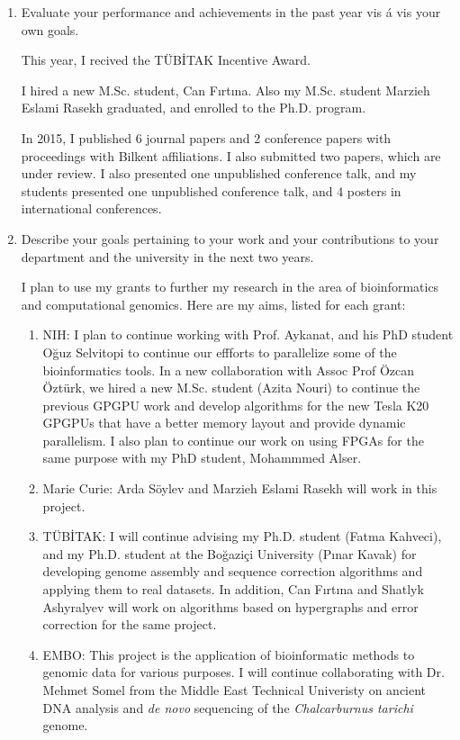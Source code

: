 \begin{enumerate}

\item Evaluate your performance and achievements in the past year vis á vis your own goals. 

This year, I recived the TÜBİTAK Incentive Award.

I hired a new M.Sc. student, Can Fırtına. Also my M.Sc. student Marzieh Eslami Rasekh graduated, and enrolled to the Ph.D. program.

In 2015, I published 6 journal papers and 2 conference papers with proceedings with Bilkent affiliations. I also submitted two papers, which are under review.
I also presented one unpublished conference talk, and my students presented one unpublished conference talk, and 4 posters in international conferences.


\item Describe your goals pertaining to your work and your contributions to your department and the university in the next two years. 

I plan to use my grants to further my research in the area of bioinformatics and computational genomics. Here are my aims, listed for each grant:

\begin{enumerate}

\item NIH: I plan to continue working with Prof. Aykanat, and his PhD student Oğuz Selvitopi to continue our effforts to parallelize some of the bioinformatics tools. In a new collaboration with Assoc Prof Özcan Öztürk, we hired a new M.Sc. student (Azita Nouri) to continue the previous GPGPU work and develop algorithms for the new Tesla K20 GPGPUs that have a better memory layout and provide dynamic parallelism.
I also plan to continue our work on using FPGAs for the same purpose with my PhD student, Mohammmed Alser.
\item Marie Curie: Arda Söylev and Marzieh Eslami Rasekh will work in this project.
\item TÜBİTAK: I will continue advising my Ph.D. student (Fatma Kahveci), and my Ph.D. student at the Boğaziçi University (Pınar Kavak) for developing genome assembly and sequence correction algorithms and applying them to real datasets. In addition, Can Fırtına and Shatlyk Ashyralyev will work on algorithms based on hypergraphs and error correction for the same project.
\item EMBO: This project is the application of bioinformatic methods to genomic data for various purposes. I will continue collaborating with Dr. Mehmet Somel from the Middle East Technical Univeristy
on ancient DNA analysis and {\it de novo} sequencing of the {\it Chalcarburnus tarichi} genome.

\end{enumerate}

\end{enumerate}

